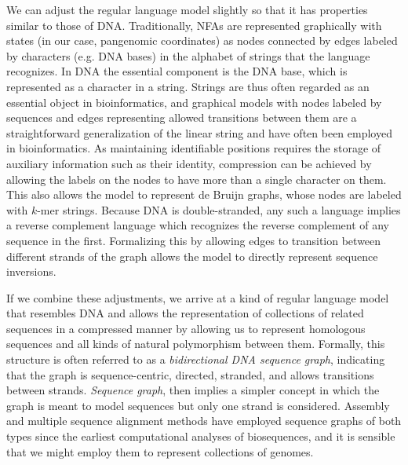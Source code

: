 We can adjust the regular language model slightly so that it has properties similar to those of DNA.
Traditionally, NFAs are represented graphically with states (in our case, pangenomic coordinates) as nodes connected by edges labeled by characters (e.g. DNA bases) in the alphabet of strings that the language recognizes.
In DNA the essential component is the DNA base, which is represented as a character in a string.
Strings are thus often regarded as an essential object in bioinformatics, and graphical models with nodes labeled by sequences and edges representing allowed transitions between them are a straightforward generalization of the linear string and have often been employed in bioinformatics.
As maintaining identifiable positions requires the storage of auxiliary information such as their identity, compression can be achieved by allowing the labels on the nodes to have more than a single character on them.
This also allows the model to represent de Bruijn graphs, whose nodes are labeled with $k$-mer strings.
Because DNA is double-stranded, any such a language implies a reverse complement language which recognizes the reverse complement of any sequence in the first.
Formalizing this by allowing edges to transition between different strands of the graph allows the model to directly represent sequence inversions.

If we combine these adjustments, we arrive at a kind of regular language model that resembles DNA and allows the representation of collections of related sequences in a compressed manner by allowing us to represent homologous sequences and all kinds of natural polymorphism between them.
Formally, this structure is often referred to as a \emph{bidirectional DNA sequence graph}, indicating that the graph is sequence-centric, directed, stranded, and allows transitions between strands.
\emph{Sequence graph}, then implies a simpler concept in which the graph is meant to model sequences but only one strand is considered.
Assembly and multiple sequence alignment methods have employed sequence graphs of both types since the earliest computational analyses of biosequences, and it is sensible that we might employ them to represent collections of genomes.

